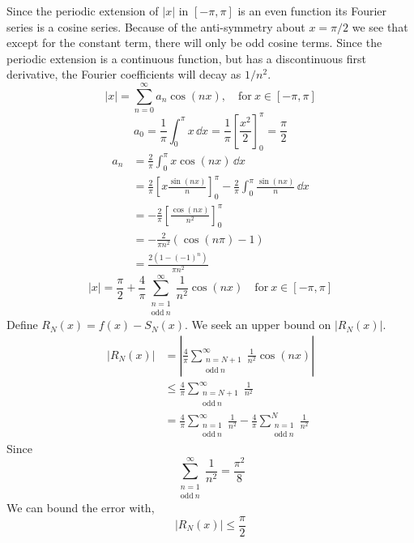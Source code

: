 {%
\begin{Solution}
  Since the periodic extension of $|x|$ in $[-\pi,\pi]$ is an even function
  its Fourier series is a cosine series.  Because of the anti-symmetry
  about $x = \pi/2$ we see that except for the constant term, there will
  only be odd cosine terms.  Since the periodic extension is a continuous
  function, but has a discontinuous first derivative, the Fourier coefficients
  will decay as $1/n^2$.
  \[
  |x| = \sum_{n = 0}^\infty a_n \cos(n x), 
  \quad \mathrm{for}\ x \in [-\pi,\pi]
  \]
  \[
  a_0 = \frac{1}{\pi} \int_0^\pi x \,\dd x 
  = \frac{1}{\pi} \left[ \frac{x^2}{2} \right]_0^\pi
  = \frac{\pi}{2}
  \]
  \begin{align*}
    a_n     &= \frac{2}{\pi} \int_0^\pi x \cos(n x) \,\dd x \\
    &= \frac{2}{\pi} \left[ x \frac{\sin(n x)}{n} \right]_0^\pi
    - \frac{2}{\pi} \int_0^\pi \frac{\sin(n x)}{n} \,\dd x \\
    &= - \frac{2}{\pi} \left[ \frac{\cos(n x)}{n^2} \right]_0^\pi \\
    &= - \frac{2}{\pi n^2} (\cos(n \pi) - 1) \\
    &= \frac{2 (1 - (-1)^n)}{\pi n^2}
  \end{align*}
  \[
  |x| = \frac{\pi}{2} 
  + \frac{4}{\pi} \sum_{\substack{n = 1 \\ \mathrm{odd}\ n}}^\infty 
  \frac{1}{n^2} \cos(n x)
  \quad \mathrm{for}\ x \in [-\pi,\pi]
  \]
  Define $R_N(x) = f(x) - S_N(x)$.  We seek an upper bound on $|R_N(x)|$.
  \begin{align*}
    \left| R_N(x) \right|
    &= \left| \frac{4}{\pi} 
      \sum_{\substack{n = N+1 \\ \mathrm{odd}\ n}}^\infty
      \frac{1}{n^2} \cos(n x) \right| \\
    &\leq \frac{4}{\pi} \sum_{\substack{n = N+1 \\ \mathrm{odd}\ n}}^\infty
    \frac{1}{n^2} \\
    &= \frac{4}{\pi} \sum_{\substack{n = 1 \\ \mathrm{odd}\ n}}^\infty
    \frac{1}{n^2} 
    - \frac{4}{\pi} \sum_{\substack{n = 1 \\ \mathrm{odd}\ n}}^N
    \frac{1}{n^2} 
  \end{align*}
  Since 
  \[
  \sum_{\substack{n = 1 \\ \mathrm{odd}\ n}}^\infty \frac{1}{n^2} 
  = \frac{\pi^2}{8}
  \]
  We can bound the error with,
  \[
  |R_N(x)| \leq \frac{\pi}{2} 
\]
\end{Solution}}
